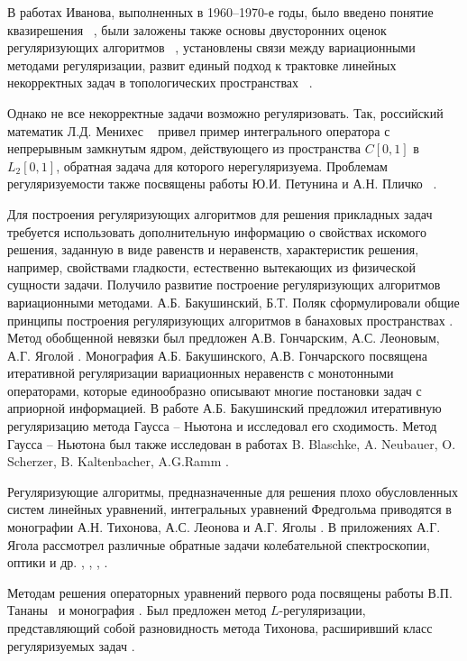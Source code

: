 {В работах Иванова, выполненных в 1960--1970-е годы, было введено понятие квазирешения ~\cite{Iv1962_2, Iv1963}, были заложены также основы двусторонних оценок регуляризующих алгоритмов ~\cite{Iv1966}, установлены связи между вариационными методами регуляризации, развит единый подход к трактовке линейных некорректных задач в топологических пространствах ~\cite{Iv1967}. 

Однако не все некорректные задачи возможно регуляризовать. Так, российский математик Л.Д. Менихес ~\cite{Menih1978} привел пример интегрального оператора с непрерывным замкнутым ядром, действующего из пространства \( C[0,1] \) в \( L_2[0,1] \), обратная задача для которого нерегуляризуема. Проблемам регуляризуемости также посвящены работы Ю.И. Петунина и А.Н. Пличко ~\cite{PetPlich1980}.

Для построения регуляризующих алгоритмов для решения прикладных задач требуется использовать дополнительную информацию о свойствах искомого решения, заданную в виде равенств и неравенств, характеристик решения, например, свойствами гладкости, естественно вытекающих из физической сущности задачи. Получило развитие построение регуляризующих алгоритмов вариационными методами. А.Б. Бакушинский, Б.Т. Поляк сформулировали общие принципы построения регуляризующих алгоритмов в банаховых пространствах \cite{BakPol1974}. Метод обобщенной невязки был предложен А.В. Гончарским, А.С. Леоновым, А.Г. Яголой \cite{GonLeoYag1973}.  Монография А.Б. Бакушинского, А.В. Гончарского \cite{BakGon1989} посвящена итеративной регуляризации вариационных неравенств с монотонными операторами, которые единообразно описывают многие постановки задач с априорной информацией. В работе \cite{Bak1992} А.Б. Бакушинский предложил итеративную регуляризацию метода Гаусса -- Ньютона и исследовал его сходимость. Метод Гаусса -- Ньютона был также исследован в работах B. Blaschke, A. Neubauer, O. Scherzer, B. Kaltenbacher, A.G.Ramm \cite{BlaNeuSch1997,KalNeuRam2002}.

Регуляризующие алгоритмы, предназначенные для решения плохо обусловленных систем линейных уравнений, интегральных уравнений Фредгольма приводятся в монографии А.Н. Тихонова, А.С. Леонова и А.Г. Яголы \cite{TihLeoYag2017}. В приложениях А.Г. Ягола рассмотрел различные обратные задачи колебательной спектроскопии, оптики и др. \cite{KliKosLiYag2016}, \cite{IsaLukTihYag2017}, \cite{KocKurPenYag2017}, \cite{LukYag2016}.

Методам решения операторных уравнений первого рода посвящены работы В.П. Тананы~\cite{Tan1977, Tan1997} и монография \cite{Tan1981}. Был предложен метод $L$-регуляризации, представляющий собой разновидность метода Тихонова, расширивший класс регуляризуемых задач \cite{Tan2003_1,Tan2003_2}.

}
